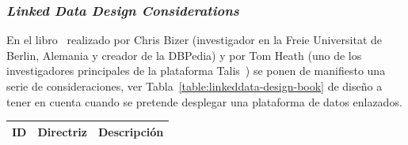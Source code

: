 \subsubsection{\textit{Linked Data Design Considerations}}\label{linked-data-design-issues}
En el libro~\cite{Heath_Bizer_2011} realizado por Chris Bizer (investigador en la Freie Universitat de Berlin, Alemania y creador de la DBPedia) y 
por Tom Heath (uno de los investigadores principales de la plataforma Talis~\cite{talis}) se ponen de manifiesto una serie de consideraciones, ver Tabla~\ref{table:linkeddata-design-book}
de diseño a tener en cuenta cuando se pretende desplegar una plataforma de datos enlazados. 


\begin{longtable}[c]{|l|p{7cm}|p{8cm}|} 

\hline

  \textbf{ID} & \textbf{Directriz} &  \textbf{Descripción} \\\hline


\end{longtable}
